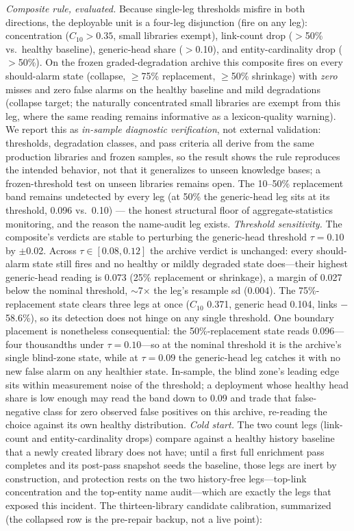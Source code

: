 \documentclass[preprint,12pt]{elsarticle}
\begin{document}
\begin{itemize}
\emph{Composite rule, evaluated.} Because single-leg thresholds
misfire in both directions, the deployable unit is a four-leg
disjunction (fire on any leg): concentration ($C_{10}{>}0.35$, small
libraries exempt), link-count drop ($>$50\% vs.\ healthy baseline),
generic-head share ($>$0.10), and entity-cardinality drop ($>$50\%).
On the frozen graded-degradation archive this composite fires on
every should-alarm state (collapse, ${\ge}$75\% replacement,
${\ge}$50\% shrinkage) with \emph{zero} misses and zero false alarms
on the healthy baseline and mild degradations (collapse target; the
naturally concentrated small libraries are exempt from this leg, where
the same reading remains informative as a lexicon-quality warning). We report this as
\emph{in-sample diagnostic verification}, not external validation:
thresholds, degradation classes, and pass criteria all derive from the
same production libraries and frozen samples, so the result shows the
rule reproduces the intended behavior, not that it generalizes to
unseen knowledge bases; a frozen-threshold test on unseen libraries
remains open. The 10--50\%
replacement band remains undetected by every leg (at 50\% the
generic-head leg sits at its threshold, 0.096 vs.\ 0.10) --- the
honest structural floor of aggregate-statistics monitoring, and the
reason the name-audit leg exists.
\emph{Threshold sensitivity.} The composite's verdicts are stable to
perturbing the generic-head threshold $\tau{=}0.10$ by $\pm$0.02.
Across $\tau \in [0.08, 0.12]$ the archive verdict is unchanged:
every should-alarm state still fires and no healthy or mildly
degraded state does---their highest generic-head reading is 0.073
(25\% replacement or shrinkage), a margin of 0.027 below the nominal
threshold, ${\sim}$7$\times$ the leg's resample sd (0.004). The
75\%-replacement state clears three legs at once ($C_{10}$ 0.371,
generic head 0.104, links $-$58.6\%), so its detection does not hinge
on any single threshold. One boundary placement is nonetheless
consequential: the 50\%-replacement state reads 0.096---four
thousandths under $\tau{=}0.10$---so at the nominal threshold it is
the archive's single blind-zone state, while at $\tau{=}0.09$ the
generic-head leg catches it with no new false alarm on any healthier
state. In-sample, the blind zone's leading edge sits within
measurement noise of the threshold; a deployment whose healthy head
share is low enough may read the band down to 0.09 and trade that
false-negative class for zero observed false positives on this
archive, re-reading the choice against its own healthy distribution.
\emph{Cold start.} The two count legs (link-count and
entity-cardinality drops) compare against a healthy history baseline
that a newly created library does not have; until a first full
enrichment pass completes and its post-pass snapshot seeds the
baseline, those legs are inert by construction, and protection rests
on the two history-free legs---top-link concentration and the
top-entity name audit---which are exactly the legs that exposed this
incident.
 The thirteen-library candidate calibration,
summarized (the collapsed row is the pre-repair backup, not a live
point):


\end{itemize}
\end{document}
